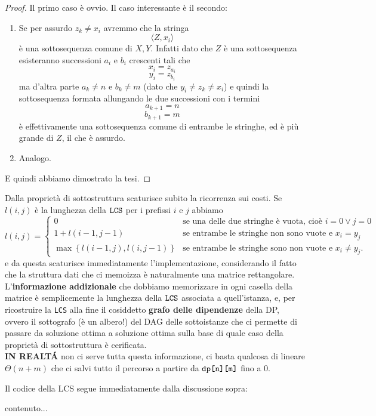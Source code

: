 \documentclass[11pt]{scrartcl}
\newcommand{\bigtheta}[1]{\Theta\!\left(#1\right)}
\begin{document}
	\begin{proof}
		Il primo caso è ovvio. Il caso interessante è il secondo:
		\begin{enumerate}
			\item[2a)] Se per assurdo $z_k\ne x_i$ avremmo che la stringa 
			$$\langle Z,x_i\rangle$$
			è una sottosequenza comune di $X,Y$. Infatti dato che $Z$ è una sottosequenza esisteranno successioni $a_i$ e $b_i$ crescenti tali che
			$$x_i=z_{a_i}$$
			$$y_i=z_{b_i}$$
			ma d'altra parte $a_k\ne n$ e $b_k\ne m$ (dato che $y_i\ne z_k\ne x_i$) e quindi la sottosequenza formata allungando le due successioni con i termini
			$$a_{k+1}=n$$
			$$b_{k+1}=m$$
			è effettivamente una sottosequenza comune di entrambe le stringhe, ed è più grande di $Z$, il che è assurdo.
			\item[2b)] Analogo.
 		\end{enumerate}
 		E quindi abbiamo dimostrato la tesi.
	\end{proof}
	
	Dalla proprietà di sottostruttura scaturisce subito la ricorrenza sui costi. Se $l(i,j)$ è la lunghezza della $\verb*|LCS|$ per i prefissi $i$ e $j$ abbiamo
	$$
	l(i,j)=
	\begin{cases}
		0 & \text{se una delle due stringhe è vuota, cioè $i=0\lor j=0$} \\
		1+l(i-1,j-1) & \text{se entrambe le stringhe non sono vuote e $x_i=y_j$} \\
		\max\left\{l(i-1,j),l(i,j-1)\right\} & \text{se entrambe le stringhe sono non vuote e $x_i\ne y_j$.}
	\end{cases}
	$$
	e da questa scaturisce immediatamente l'implementazione, considerando il fatto che la struttura dati che ci memoizza è naturalmente una matrice rettangolare. L'\textbf{informazione addizionale} che dobbiamo memorizzare in ogni casella della matrice è semplicemente la lunghezza della $\verb*|LCS|$ associata a quell'istanza, e, per ricostruire la \verb*|LCS| alla fine il cosiddetto \textbf{grafo delle dipendenze} della DP, ovvero il sottografo (è un albero!) del DAG delle sottoistanze che ci permette di passare da soluzione ottima a soluzione ottima sulla base di quale caso della proprietà di sottostruttura è cerificata. \\
	\textbf{IN REALT\'A} non ci serve tutta questa informazione, ci basta qualcosa di lineare $\bigtheta{n+m}$ che ci salvi tutto il percorso a partire da $\verb*|dp[n][m]|$ fino a $0$.
	\begin{algorithm}[LCS]
		Il codice della LCS segue immediatamente dalla discussione sopra:
	\end{algorithm}
	\begin{algorithm}
		contenuto...
	\end{algorithm}
	
\end{document}
